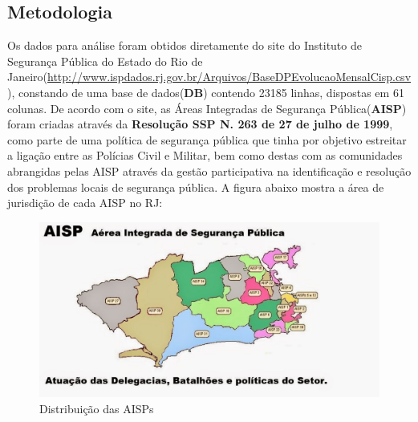 \documentclass[a4paper, 12pt]{article}
\begin{document}
\begin{multicols}{2}
		\section{Metodologia}
		 Os dados para análise foram obtidos diretamente do site do Instituto de Segurança Pública do Estado do Rio de Janeiro(\url{http://www.ispdados.rj.gov.br/Arquivos/BaseDPEvolucaoMensalCisp.csv}), constando de uma base de dados(\textbf{DB}) contendo 23185 linhas, dispostas em 61 colunas.  De acordo com o site, as Áreas Integradas de Segurança Pública(\textbf{AISP}) foram criadas através da \textbf{Resolução SSP N. 263 de 27 de julho de 1999}, como parte de uma política de segurança pública que tinha por objetivo estreitar a ligação entre as Polícias Civil e Militar, bem como destas com as comunidades abrangidas pelas AISP através da gestão participativa na identificação e resolução dos problemas locais de segurança pública.  A figura abaixo mostra a área de jurisdição de cada AISP no RJ:
	\end{multicols}
	\begin{figure}[H]
		\centering
		\includegraphics[width=0.8\linewidth]{aisp}
		\caption{Distribuição das AISPs}
		\label{fig:aisps}
	\end{figure}
\end{document}
